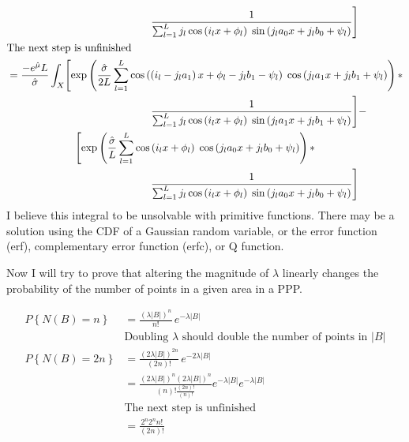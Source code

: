 \documentclass[12pt,dvipsnames]{report}
\begin{document}
\begin{align}
& \hspace{1.9in} \frac{1}{\sum_{l=1}^L j_l \cos\left( i_l x + \phi_l \right) \; \sin\left( j_l a_0 x + j_l b_0 + \psi_l \right)} \Biggr] \\
&\text{The next step is unfinished} \nonumber \\
&= \frac{-e^{\hat{\mu}} L}{\hat{\sigma}} \int_X \Biggl[ \exp\left( \frac{\hat{\sigma}}{2L} \sum_{l=1}^L \cos\left( \left( i_l - j_l a_1 \right) x + \phi_l - j_l b_1 - \psi_l \right) \; \cos\left( j_l a_1 x + j_l b_1 + \psi_l \right) \right) * \nonumber \\
& \hspace{1.9in} \frac{1}{\sum_{l=1}^L j_l \cos\left( i_l x + \phi_l \right) \; \sin\left( j_l a_1 x + j_l b_1 + \psi_l \right)} \Biggr] - \nonumber \\
& \hspace{0.9in} \Biggl[ \exp\left( \frac{\hat{\sigma}}{L} \sum_{l=1}^L \cos\left( i_l x + \phi_l \right) \; \cos\left( j_l a_0 x + j_l b_0 + \psi_l \right) \right) * \nonumber \\
& \hspace{1.9in} \frac{1}{\sum_{l=1}^L j_l \cos\left( i_l x + \phi_l \right) \; \sin\left( j_l a_0 x + j_l b_0 + \psi_l \right)} \Biggr] \\
\end{align}
I believe this integral to be unsolvable with primitive functions.  There may be a solution using the CDF of a Gaussian random variable, or the error function (erf), complementary error function (erfc), or Q function.

Now I will try to prove that altering the magnitude of $\lambda$ linearly changes the probability of the number of points in a given area in a PPP.

\begin{align}
P\left\{ N\left( B \right) = n \right\} &= \frac{\left( \lambda | B | \right)^n}{n!} \, e^{-\lambda | B |} \\
& \text{Doubling $\lambda$ should double the number of points in $| B |$} \nonumber \\
P\left\{ N\left( B \right) = 2n \right\} &= \frac{\left( 2 \lambda | B | \right)^{2n}}{\left( 2n \right)!} \, e^{-2 \lambda | B |} \\
&= \frac{\left( 2 \lambda | B | \right)^n \left( 2 \lambda | B | \right)^n}{\left( n \right)! \frac{\left( 2n \right)!}{\left( n \right)!}} e^{-\lambda | B |} e^{-\lambda | B |} \\
&\text{The next step is unfinished} \nonumber \\
&= \frac{2^n 2^n n!}{\left( 2n \right)!}
\end{align}

\fi



\end{document}
